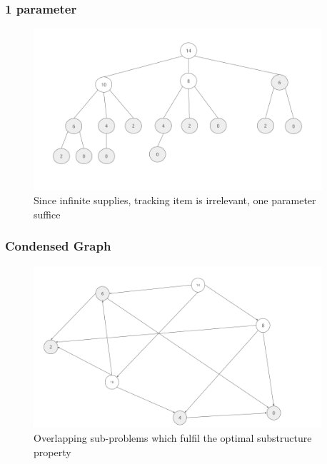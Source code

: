 \documentclass{beamer}
\begin{document}
\begin{frame}
	\frametitle{1 parameter}
	\begin{figure}
		\centering
		\includegraphics[width=0.95\textwidth]{asset/3.png}
		\caption{Since infinite supplies, tracking item is irrelevant, one parameter suffice}
	\end{figure}	
\end{frame}

\begin{frame}
	\frametitle{Condensed Graph}
	\begin{figure}
		\centering
		\includegraphics[width=0.95\textwidth]{asset/4.png}
		\caption{Overlapping sub-problems which fulfil the optimal substructure property}
	\end{figure}
\end{frame}
\end{document}
